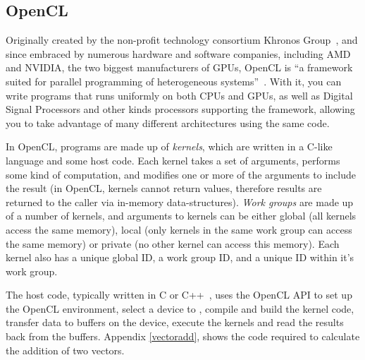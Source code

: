 \subsection{OpenCL}

Originally created by the non-profit technology consortium Khronos
Group~\cite{khronos}, and since embraced by numerous hardware and
software companies, including AMD and NVIDIA, the two biggest
manufacturers of GPUs, OpenCL is ``a framework suited for parallel
programming of heterogeneous systems''~\cite{opencl-quote}. With it,
you can write programs that runs uniformly on both CPUs and GPUs, as
well as Digital Signal Processors and other kinds processors
supporting the framework, allowing you to take advantage of many
different architectures using the same code.

In OpenCL, programs are made up of \emph{kernels}, which are written
in a C-like language and some host code. Each kernel takes a set of
arguments, performs some kind of computation, and modifies one or more
of the arguments to include the result (in OpenCL, kernels cannot
return values, therefore results are returned to the caller via
in-memory data-structures). \emph{Work groups} are made up of a number
of kernels, and arguments to kernels can be either global (all kernels
access the same memory), local (only kernels in the same work group
can access the same memory) or private (no other kernel can access
this memory). Each kernel also has a unique global ID, a work group
ID, and a unique ID within it's work group.

The host code, typically written in C or C++~\cite{hostlang}, uses the
OpenCL API to set up the OpenCL environment, select a device to ,
compile and build the kernel code, transfer data to buffers on the
device, execute the kernels and read the results back from the
buffers. Appendix \ref{vectoradd}, shows the code required to
calculate the addition of two vectors.
